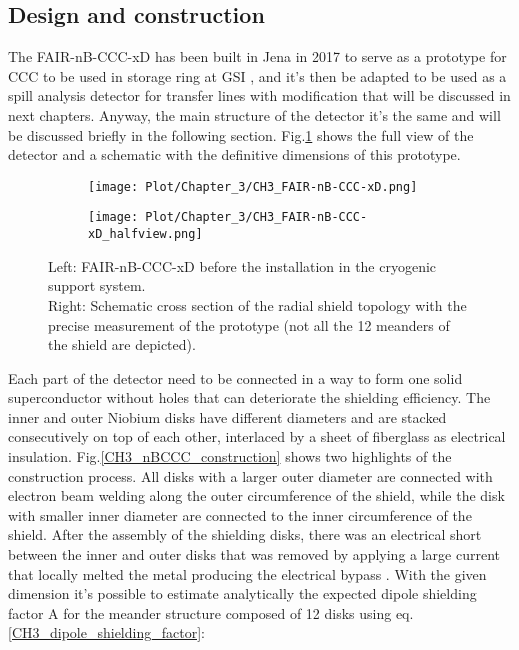\documentclass[12pt,a4paper]{report}
\begin{document}
        \subsection{Design and construction}
        The FAIR-nB-CCC-xD has been built in Jena in 2017 to serve as a prototype for CCC to be used in storage ring at GSI \cite{DavidThesis}, and it's then be adapted to be used as a spill analysis detector for transfer lines with modification that will be discussed in next chapters. Anyway, the main structure of the detector it's the same and will be discussed briefly in the following section. Fig.\ref{CH3_radial_CCC} shows the full view of the detector and a schematic with the definitive dimensions of this prototype.
        \begin{figure}[H]
        	\centering
        	\begin{subfigure}[b]{0.4\textwidth}
        		\centering
        		\texttt{[image: Plot/Chapter\_3/CH3\_FAIR-nB-CCC-xD.png]}
        	\end{subfigure}
        	\hfill
        	\begin{subfigure}[b]{0.55\textwidth}
        		\centering
        		\texttt{[image: Plot/Chapter\_3/CH3\_FAIR-nB-CCC-xD\_halfview.png]}
        	\end{subfigure}
        	\caption{\small{ Left: FAIR-nB-CCC-xD before the installation in the cryogenic support system. \\ Right: Schematic cross section of the radial shield topology with the precise measurement of the prototype (not all the 12 meanders of the shield are depicted).}}
        	\label{CH3_radial_CCC}
        \end{figure}
        Each part of the detector need to be connected in a way to form one solid superconductor without holes that can deteriorate the shielding efficiency. The inner and outer Niobium disks have different diameters and are stacked consecutively on top of each other, interlaced by a sheet of fiberglass as electrical insulation. Fig.\ref{CH3_nBCCC_construction} shows two highlights of the construction process. All disks with a larger outer diameter are connected with electron beam welding along the outer circumference of the shield, while the disk with smaller inner diameter are connected to the inner circumference of the shield. After the assembly of the shielding disks, there was an electrical short between the inner and outer disks that was removed by applying a large current that locally melted the metal producing the electrical bypass \cite{DavidThesis}. With the given dimension it's possible to estimate analytically the expected dipole shielding factor A for the meander structure composed of 12 disks using eq.\ref{CH3_dipole_shielding_factor}:
\end{document}
